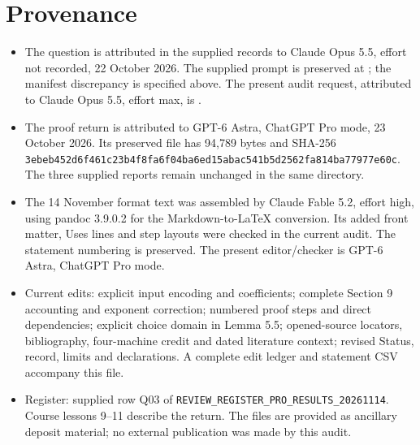 \documentclass[11pt,a4paper]{article}
\theoremstyle{plain}
\theoremstyle{definition}
\newcommand{\fixedhead}[1]{\section*{#1}}
\begin{document}
\fixedhead{Provenance}
\begin{itemize}[leftmargin=*,itemsep=3pt]
\item The question is attributed in the supplied records to Claude Opus 5.5, effort not recorded, 22 October 2026. The supplied prompt is preserved at ; the manifest discrepancy is specified above. The present audit request, attributed to Claude Opus 5.5, effort max, is .
\item The proof return is attributed to GPT-6 Astra, ChatGPT Pro mode, 23 October 2026. Its preserved file  has 94,789 bytes and SHA-256
\texttt{3ebeb452d6f461c2\allowbreak 3b4f8fa6f04ba6ed\allowbreak 15abac541b5d2562\allowbreak fa814ba77977e60c}.
The three supplied reports remain unchanged in the same directory.
\item The 14 November format text was assembled by Claude Fable 5.2, effort high, using pandoc 3.9.0.2 for the Markdown-to-\LaTeX{} conversion. Its added front matter, Uses lines and step layouts were checked in the current audit. The statement numbering is preserved. The present editor/checker is GPT-6 Astra, ChatGPT Pro mode.
\item Current edits: explicit input encoding and coefficients; complete Section 9 accounting and exponent correction; numbered proof steps and direct dependencies; explicit choice domain in Lemma 5.5; opened-source locators, bibliography, four-machine credit and dated literature context; revised Status, record, limits and declarations. A complete edit ledger and statement CSV accompany this file.
\item Register: supplied row Q03 of \texttt{REVIEW\_REGISTER\_PRO\_RESULTS\_20261114}. Course lessons 9--11 \cite[dated 24 October 2026]{L} describe the return. The  files are provided as ancillary deposit material; no external publication was made by this audit.
\end{itemize}
\end{document}
